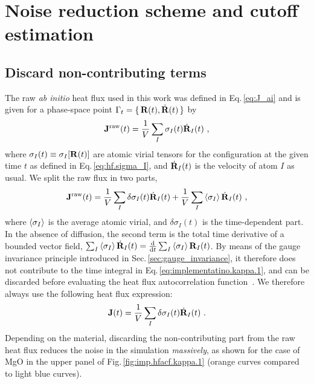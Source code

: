 \section{Noise reduction scheme and cutoff estimation}
\subsection{Discard non-contributing terms}
The raw \emph{ab initio} heat flux used in this work was defined in Eq.\,\eqref{eq:J_ai} and is given for a phase-space point $\Gamma_t = \set{{\bf R} (t), \dot{{\bf R}} (t)}$ by
\begin{align}
	{\bf J}^{\rm raw} (t) 
		= \frac{1}{V} \sum_I \sigma_I (t)  \dot{{\bf R}}_I (t)~,
	\label{eq:imp.J.0}
\end{align}
where $\sigma_I (t) \equiv \sigma_I [{\bf R} (t)]$ are atomic virial tensors for the configuration at the given time $t$ as defined in Eq.\,\eqref{eq:hf.sigma_I}, and $\dot{{\bf R}}_I (t)$ is the velocity of atom $I$ as usual. We split the raw flux in two parts,
\begin{align}
	{\bf J}^{\rm raw} (t)
		= \frac{1}{V} \sum_I \delta \sigma_I (t) \dot{{\bf R}}_I (t) 
		+ \frac{1}{V} \sum_I \braket{{\sigma_I}} \dot{{\bf R}}_I (t)~,
	\label{eq:imp.J.1}
\end{align}
where $\braket{\sigma_I}$ is the average atomic virial, and $\delta \sigma_I (t)$ is the time-dependent part. In the absence of diffusion, the second term is the total time derivative of a bounded vector field, $\sum_I \braket{\sigma_I} \dot{{\bf R}}_I (t) = \frac{{\rm d}}{{\rm d} t} \sum_I \braket{{\sigma_I}} {\bf R}_I (t)$. By means of the gauge invariance principle introduced in Sec.\,\ref{sec:gauge_invariance}, it therefore does not contribute to the time integral in Eq.\,\eqref{eq:implementatino.kappa.1}, and can be discarded before evaluating the heat flux autocorrelation function~\cite{Ercole.2016}. We therefore always use the following heat flux expression:
\begin{align}
	{\bf J} (t)
		= \frac{1}{V} \sum_I \delta \sigma_I (t) \dot{{\bf R}}_I (t)~.
	\label{eq:imp.J}
\end{align}
Depending on the material, discarding the non-contributing part from the raw heat flux reduces the noise in the simulation \emph{massively}, as shown for the case of MgO in the upper panel of Fig.\,\ref{fig:imp.hfacf.kappa.1} (orange curves compared to light blue curves).

